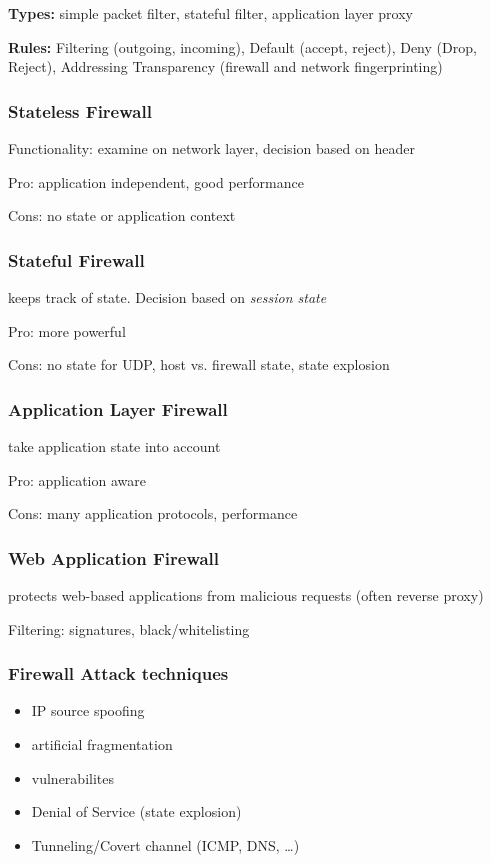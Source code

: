 \documentclass[fs, footer]{latex4ei}
\begin{document}
\begin{multicols*}{4}
{\textbf{Types:} simple packet filter, stateful filter, application layer proxy

\textbf{Rules:} Filtering (outgoing, incoming), Default (accept, reject), Deny (Drop, Reject), Addressing Transparency (firewall and network fingerprinting)

\subsubsection{Stateless Firewall}
Functionality: examine on network layer, decision based on header

Pro: application independent, good performance

Cons: no state or application context 

\subsubsection{Stateful Firewall}
keeps track of state. Decision based on \emph{session state}

Pro: more powerful

Cons: no state for UDP, host vs. firewall state, state explosion
  
 \subsubsection{Application Layer Firewall}
 take application state into account

 Pro: application aware

 Cons: many application protocols, performance

 \subsubsection{Web Application Firewall}
protects web-based applications from malicious requests (often reverse proxy)

Filtering: signatures, black/whitelisting

 \subsubsection{Firewall Attack techniques}
 \begin{itemize}
 	\item IP source spoofing
 	\item artificial fragmentation
 	\item vulnerabilites
 	\item Denial of Service (state explosion)
 	\item Tunneling/Covert channel (ICMP, DNS, \ldots)
 \end{itemize}

}
\end{multicols*}
\end{document}
